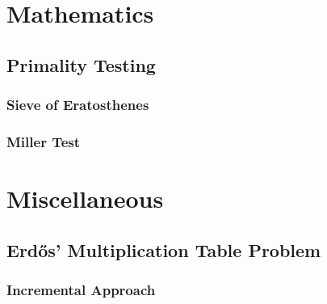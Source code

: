 \documentclass[12pt]{book}
\newcommand{\<}{\langle}
\renewcommand{\>}{\rangle}
\renewcommand{\(}{\left(}
\renewcommand{\)}{\right)}
\begin{document}
    \section{Mathematics}
        \subsection{Primality Testing}
            \subsubsection{Sieve of Eratosthenes}
                

        \subsubsection{Miller Test}
            

    \section{Miscellaneous}
        \subsection{Erdős' Multiplication Table Problem}
            \subsubsection{Incremental Approach}
                

\printbibliography
\end{document}
